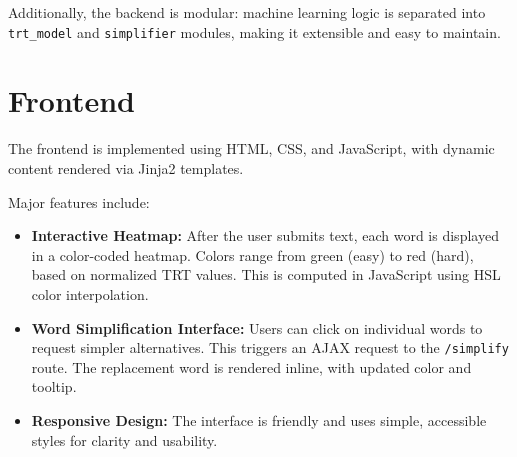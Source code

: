 Additionally, the backend is modular: machine learning logic is separated into \texttt{trt\_model} and \texttt{simplifier} modules, making it extensible and easy to maintain.

\section{Frontend}
The frontend is implemented using HTML, CSS, and JavaScript, with dynamic content rendered via Jinja2 templates.

Major features include:
\begin{itemize}
    \item \textbf{Interactive Heatmap:} After the user submits text, each word is displayed in a color-coded heatmap. Colors range from green (easy) to red (hard), based on normalized TRT values. This is computed in JavaScript using HSL color interpolation.

    \item \textbf{Word Simplification Interface:} Users can click on individual words to request simpler alternatives. This triggers an AJAX request to the \texttt{/simplify} route. The replacement word is rendered inline, with updated color and tooltip.
    
    \item \textbf{Responsive Design:} The interface is friendly and uses simple, accessible styles for clarity and usability.
\end{itemize}